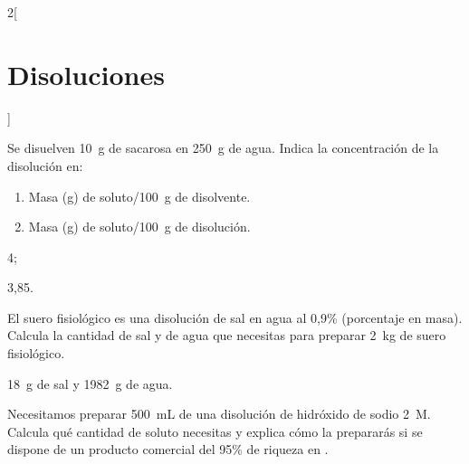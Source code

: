 \documentclass[10pt]{article}
\begin{document}
\begin{multicols}{2}[
  \section{Disoluciones}
  ]

  \begin{exercise}[
      tags    = {termodinámica, entalpía, entalpia de reacción, calor},
      topics  = {química, termoquímica, termodinámica},
      source  = {FQ 1B OXF 2015, p78, e9},
    ]
    Se disuelven \SI{10}{\gram} de sacarosa en \SI{250}{\gram} de agua. Indica la concentración de la disolución en:
    \begin{enumerate}
      \item Masa (\si{\gram}) de soluto/\SI{100}{\gram} de disolvente.
      \item Masa (\si{\gram}) de soluto/\SI{100}{\gram} de disolución.
    \end{enumerate}
  \end{exercise}

  \begin{solution}
    \begin{enumerate*}
      \item 4;
      \item 3,85.
    \end{enumerate*}
  \end{solution}



  \begin{exercise}[
      tags    = {termodinámica, entalpía, entalpia de reacción, calor},
      topics  = {química, termoquímica, termodinámica},
      source  = {FQ 1B SAN 2015, p92, e25},
    ]
    El suero fisiológico es una disolución de sal en agua al 0,9\%
    (porcentaje en masa). Calcula la cantidad de sal y de agua
    que necesitas para preparar \SI{2}{\kilo\gram} de suero fisiológico.
  \end{exercise}

  \begin{solution}
    \SI{18}{\gram} de sal y \SI{1982}{\gram} de agua.
  \end{solution}




  \begin{exercise}[
      tags    = {termodinámica, entalpía, entalpia de reacción, calor},
      topics  = {química, termoquímica, termodinámica},
      source  = {FQ 1B SAN 2015, p92, e28},
    ]
    Necesitamos preparar \SI{500}{\milli\liter} de una disolución de hidróxido de sodio \SI{2}{M}. Calcula qué cantidad de soluto necesitas y explica cómo la prepararás si se dispone de un producto comercial del 95\% de riqueza en .
  \end{exercise}


\end{multicols}
\end{document}
